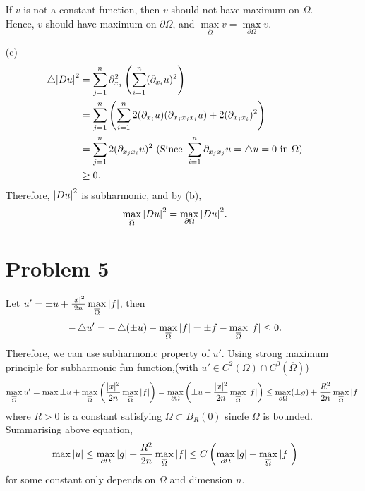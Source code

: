 \documentclass{article}
\newcommand*\Laplace{\mathop{}\!\mathbin\bigtriangleup}
\begin{document}
\begin{enumerate}
If $v$ is not a constant function, then $v$ should not have maximum on $\Omega$. Hence, $v$ should have maximum on $\partial \Omega$, and $\max\limits_{\overline{\Omega}} v=\max\limits_{\partial \Omega}v$.
\item[(c)] 
\begin{equation*}
\begin{split}
\Laplace \abs{Du}^2&=\sum\limits_{j=1}^n \partial^2_{x_j}\left(\sum\limits_{i=1}^n (\partial_{x_i} u)^2\right)\\
&=\sum\limits_{j=1}^n\left(\sum\limits_{i=1}^n 2(\partial_{x_i} u)(\partial_{x_j x_j x_i} u)+2(\partial_{x_j x_i})^2\right)\\
&=\sum\limits_{j=1}^n 2(\partial_{x_j x_i}u)^2 \text{ (Since } \sum\limits_{i=1}^n\partial_{x_j x_j}u=\Laplace u=0\text{ in } \Omega \text{)}\\
&\geq 0.
\end{split}
\end{equation*}
Therefore, $\abs{Du}^2$ is subharmonic, and by (b),
\begin{equation*}
\max_{\overline{\Omega}}\abs{Du}^2=\max_{\partial \Omega}\abs{Du}^2.
\end{equation*}

\section*{Problem 5}
Let $u'=\pm u+\frac{|x|^2}{2n}\max\limits_{\overline{\Omega}}\abs{f}$, then
\begin{equation*}
-\Laplace u'=-\Laplace (\pm u)-\max\limits_{\overline{\Omega}}\abs{f}=\pm f-\max\limits_{\overline{\Omega}}\abs{f}\leq 0.
\end{equation*}
Therefore, we can use subharmonic property of $u'$. Using strong maximum principle for subharmonic fun function,(with $u'\in C^2(\Omega)\cap C^0(\overline{\Omega})$)
\begin{equation*}
\max\limits_{\overline{\Omega}}u'=\max{\pm u}+\max\limits_{\overline{\Omega}} \left(\frac{|x|^2}{2n}\max\limits_{\overline{\Omega}}\abs{f}\right)=\max\limits_{\partial \Omega} \left(\pm u+\frac{|x|^2}{2n}\max\limits_{\overline{\Omega}}\abs{f}\right)\leq\max\limits_{\partial \Omega} (\pm g)+\frac{R^2}{2n}\max\limits_{\overline{\Omega}}\abs{f}
\end{equation*}
where $R>0$ is a constant satisfying $\Omega\subset B_R(0)$ sincfe $\Omega$ is bounded. Summarising above equation,
\begin{equation*}
\max\abs{u}\leq \max\limits_{\partial \Omega} \abs{g}+\frac{R^2}{2n}\max\limits_{\overline{\Omega}}\abs{f}\leq C\left(\max_{\partial\Omega}\abs{g}+\max_{\overline{\Omega}}\abs{f}\right)
\end{equation*}
for some constant only depends on $\Omega$ and dimension $n$.


\end{enumerate}
\end{document}
